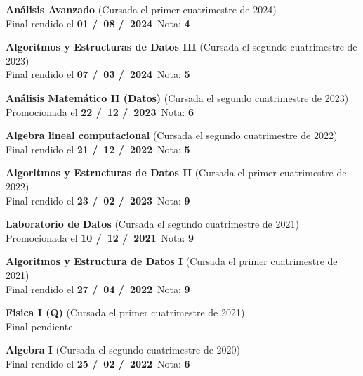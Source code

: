 \begin{itemize}[leftmargin=0.8cm]

  \item{\textbf{Análisis Avanzado} (Cursada el primer cuatrimestre de 2024)\\
  Final rendido el \textbf{01 \slash \ 08 \slash \ 2024}\  \hfill Nota: \textbf{4}}

  \item{\textbf{Algoritmos y Estructuras de Datos III} (Cursada el segundo cuatrimestre de 2023)\\
  Final rendido el \textbf{07 \slash \ 03 \slash \ 2024}\  \hfill Nota: \textbf{5}}

  \item{\textbf{Análisis Matemático II (Datos)} (Cursada el segundo cuatrimestre de 2023)\\
  Promocionada el \textbf{22 \slash \ 12 \slash \ 2023}\  \hfill Nota: \textbf{6}}

 \item{\textbf{Algebra lineal computacional} (Cursada el segundo cuatrimestre de 2022)\\
  Final rendido el \textbf{21 \slash \ 12 \slash \ 2022}\  \hfill Nota: \textbf{5}}

  \item{\textbf{Algoritmos y Estructuras de Datos II} (Cursada el primer cuatrimestre de 2022)\\
  Final rendido el \textbf{23 \slash \ 02 \slash \ 2023}\  \hfill Nota: \textbf{9}}

  \item{\textbf{Laboratorio de Datos} (Cursada el segundo cuatrimestre de 2021)\\
  Promocionada el \textbf{10 \slash \ 12 \slash \ 2021}\  \hfill Nota: \textbf{9}}

  \item{\textbf{Algoritmos y Estructura de Datos I} (Cursada el primer cuatrimestre de 2021)\\
  Final rendido el \textbf{27 \slash \ 04 \slash \ 2022}\  \hfill Nota: \textbf{9}}

  \item{\textbf{Fisica I (Q)} (Cursada el primer cuatrimestre de 2021)\\
  Final pendiente

   \item{\textbf{Algebra I} (Cursada el segundo cuatrimestre de 2020)\\
  Final rendido el \textbf{25 \slash \ 02 \slash \ 2022}\  \hfill Nota: \textbf{6}}

}
\end{itemize}
